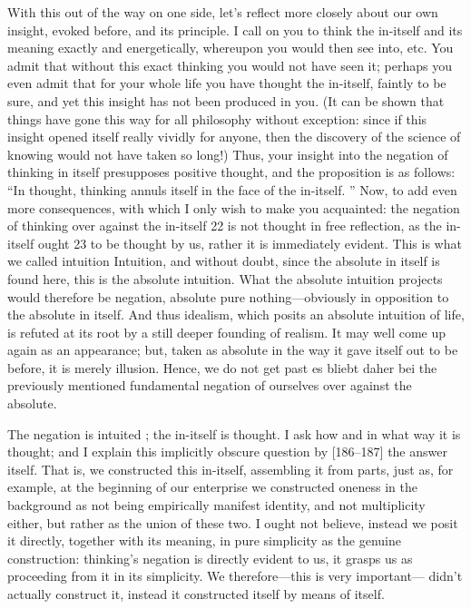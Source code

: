With this out of the way on one side, let’s reflect more closely about our
own insight, evoked before, and its principle.
I call on you to think the in-itself
and its meaning exactly and energetically, whereupon you would then see into,
etc.
You admit that without this exact thinking you would not have seen it;
perhaps you even admit that for your whole life you have thought the in-itself,
faintly to be sure, and yet this insight has not been produced in you.
(It can be
shown that things have gone this way for all philosophy without exception:
since if this insight opened itself really vividly for anyone, then the discovery
of the science of knowing would not have taken so long!) Thus, your insight
into the negation of thinking in itself presupposes positive thought, and the
proposition is as follows: “In thought, thinking annuls itself in the face of the
in-itself.
”
Now, to add even more consequences, with which I only wish to
make you acquainted: the negation of thinking over against the in-itself 22
is not thought in free reflection, as the in-itself ought 23 to be thought by us,
rather it is immediately evident.
This is what we called intuition {Intuition},
and without doubt, since the absolute in itself is found here, this is the
absolute intuition.
What the absolute intuition projects would therefore be
negation, absolute pure nothing—obviously in opposition to the absolute in
itself.
And thus idealism, which posits an absolute intuition of life, is
refuted at its root by a still deeper founding of realism.
It may well come up
again as an appearance; but, taken as absolute in the way it gave itself out
to be before, it is merely illusion.
Hence, we do not get past {es bliebt daher
bei} the previously mentioned fundamental negation of ourselves over
against the absolute.

The negation is intuited ; the in-itself is thought.
I ask how and in what
way it is thought; and I explain this implicitly obscure question by [186–187]
the answer itself.
That is, we constructed this in-itself, assembling it from
parts, just as, for example, at the beginning of our enterprise we constructed
oneness in the background as not being empirically manifest identity, and not
multiplicity either, but rather as the union of these two.
I ought not believe,
instead we posit it directly, together with its meaning, in pure simplicity as the
genuine construction: thinking’s negation is directly evident to us, it grasps us
as proceeding from it in its simplicity.
We therefore—this is very important—
didn’t actually construct it, instead it constructed itself by means of itself.

